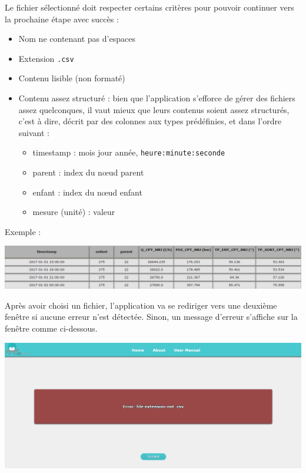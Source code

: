 		Le fichier sélectionné doit respecter certains critères pour pouvoir continuer vers la prochaine étape avec succès :
		\begin{itemize}
			\item Nom ne contenant pas d'espaces
			\item Extension \lstinline!.csv!
			\item Contenu lisible (non formaté)
			\item Contenu assez structuré : bien que l'application s'efforce de gérer des fichiers assez quelconques, il vaut mieux que leurs contenus soient assez structurés, c'est à dire, décrit par des colonnes aux types prédéfinies, et dans l'ordre suivant :
			\begin{itemize}
				\item timestamp : mois jour année, \lstinline!heure:minute:seconde!
				\item parent : index du nœud parent
				\item enfant : index du nœud enfant
				\item mesure (unité) : valeur
			\end{itemize}
		\end{itemize}
		Exemple :
		\begin{center}\includegraphics[scale=0.52]{exampleCSV.png}\end{center}
		
		Après avoir choisi un fichier, l'application va se rediriger vers une deuxième fenêtre si aucune erreur n'est détectée. Sinon, un message d'erreur s'affiche sur la fenêtre comme ci-dessous.
		
				
		\begin{center}\includegraphics[scale=0.45]{fenetreErreur.png}\end{center}
			
